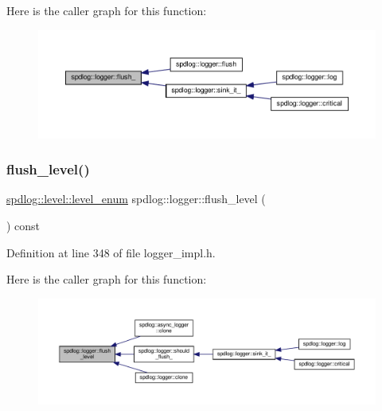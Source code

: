 Here is the caller graph for this function\+:
\nopagebreak
\begin{figure}[H]
\begin{center}
\leavevmode
\includegraphics[width=350pt]{classspdlog_1_1logger_a98981b19089a6000fdfa8765af52ef0e_icgraph}
\end{center}
\end{figure}
\mbox{\label{classspdlog_1_1logger_a1b9b7304f017163d181692e41101b648}} 
\subsubsection{\texorpdfstring{flush\+\_\+level()}{flush\_level()}}
{\footnotesize\ttfamily \hyperlink{namespacespdlog_1_1level_a35f5227e5daf228d28a207b7b2aefc8b}{spdlog\+::level\+::level\+\_\+enum} spdlog\+::logger\+::flush\+\_\+level (\begin{DoxyParamCaption}{ }\end{DoxyParamCaption}) const\hspace{0.3cm}{\ttfamily [inline]}}



Definition at line 348 of file logger\+\_\+impl.\+h.

Here is the caller graph for this function\+:
\nopagebreak
\begin{figure}[H]
\begin{center}
\leavevmode
\includegraphics[width=350pt]{classspdlog_1_1logger_a1b9b7304f017163d181692e41101b648_icgraph}
\end{center}
\end{figure}
\mbox{\label{classspdlog_1_1logger_a47c021d339c1f246758e1a87a41668e3}} 
